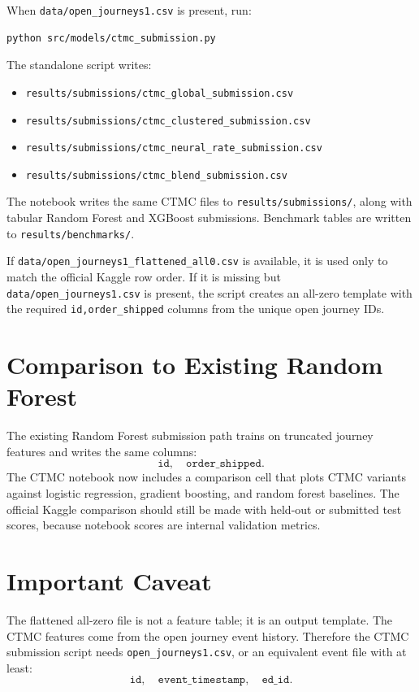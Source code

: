 \documentclass[11pt]{article}
\begin{document}
When \texttt{data/open\_journeys1.csv} is present, run:
\begin{verbatim}
python src/models/ctmc_submission.py
\end{verbatim}

The standalone script writes:
\begin{itemize}[leftmargin=*]
\item \texttt{results/submissions/ctmc\_global\_submission.csv}
\item \texttt{results/submissions/ctmc\_clustered\_submission.csv}
\item \texttt{results/submissions/ctmc\_neural\_rate\_submission.csv}
\item \texttt{results/submissions/ctmc\_blend\_submission.csv}
\end{itemize}

The notebook writes the same CTMC files to \texttt{results/submissions/}, along
with tabular Random Forest and XGBoost submissions. Benchmark tables are written
to \texttt{results/benchmarks/}.

If \texttt{data/open\_journeys1\_flattened\_all0.csv} is available, it is used
only to match the official Kaggle row order.  If it is missing but
\texttt{data/open\_journeys1.csv} is present, the script creates an all-zero
template with the required \texttt{id,order\_shipped} columns from the unique
open journey IDs.

\section{Comparison to Existing Random Forest}

The existing Random Forest submission path trains on truncated journey
features and writes the same columns:
\[
\texttt{id},\quad \texttt{order\_shipped}.
\]
The CTMC notebook now includes a comparison cell that plots CTMC variants
against logistic regression, gradient boosting, and random forest baselines.
The official Kaggle comparison should still be made with held-out or submitted
test scores, because notebook scores are internal validation metrics.

\section{Important Caveat}

The flattened all-zero file is not a feature table; it is an output template.
The CTMC features come from the open journey event history.  Therefore the CTMC
submission script needs \texttt{open\_journeys1.csv}, or an equivalent event file
with at least:
\[
\texttt{id},\quad \texttt{event\_timestamp},\quad \texttt{ed\_id}.
\]
\end{document}
